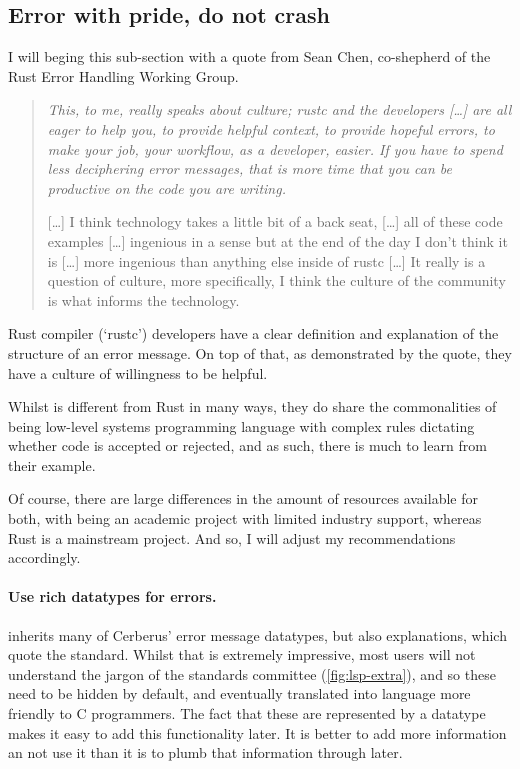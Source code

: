 \subsection{Error with pride, do not crash}\label{sec:error-msgs}

I will beging this sub-section with a quote from Sean Chen, co-shepherd
of the Rust Error Handling Working Group.~

\begin{quote}
\em
This, to me, really speaks about culture; rustc and the developers [\ldots]
are all eager to help you, to provide helpful context,
to provide hopeful errors, to make your job, your workflow, as a developer,
easier. If you have to spend less deciphering error messages, that is more time
that you can be productive on the code you are writing.

[\ldots] I think technology takes a little bit of a back seat, [\ldots] all of
these code examples [\ldots] ingenious in a sense but at the end
of the day I don't think it is [\ldots] more ingenious than anything else
inside of rustc [\ldots] It really is a question of culture, more specifically,
I think the culture of the community is what informs the technology.
\end{quote}

Rust compiler (`rustc') developers have a clear definition and explanation of
the structure of an error
message.
On top of that, as demonstrated by the quote, they have a culture of
willingness to be helpful.

Whilst  is different from Rust in many ways, they do share the
commonalities of being low-level systems programming language with complex
rules dictating whether code is accepted or rejected, and as such, there is
much to learn from their example.

Of course, there are large differences in the amount of resources available for
both, with  being an academic project with limited industry support,
whereas Rust is a mainstream project. And so, I will adjust my recommendations
accordingly.

\paragraph{Use rich datatypes for errors.}  inherits many of Cerberus'
error message datatypes, but also explanations, which quote the standard.
Whilst that is extremely impressive, most users will not understand the jargon
of the standards committee (\cref{fig:lsp-extra}), and so these need to be
hidden by default, and eventually translated into language more friendly to C
programmers. The fact that these are represented by a datatype makes it easy to
add this functionality later. It is better to add more information an not use
it than it is to plumb that information through later.

